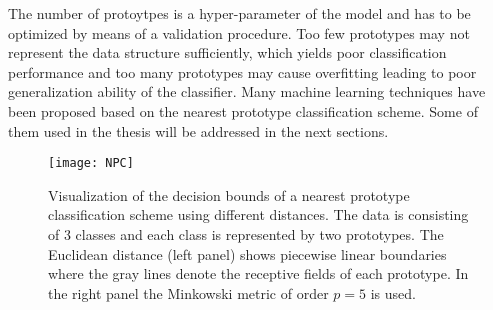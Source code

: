 The number of protoytpes is a hyper-parameter of the model and has to be optimized by means of a validation procedure.  
Too few prototypes may not represent the data structure sufficiently, which yields poor classification performance and 
too many prototypes may cause overfitting leading to poor generalization ability of the classifier. 
Many machine learning techniques have been proposed based on the nearest prototype classification scheme. 
Some of them used in the thesis will be addressed in the next sections. 

\begin{figure}[tpb]
\centering
\texttt{[image: NPC]}%
\caption[Nearest prototype classification]{Visualization of the decision bounds of a nearest prototype classification scheme 
using different distances. The data is consisting of 3 classes and each class is represented by two prototypes. 
The Euclidean distance (left panel) shows piecewise linear boundaries where the gray lines denote the receptive fields of each prototype. 
In the right panel the Minkowski metric of order $p=5$ is used.%
}
\label{fig:NPC}
\end{figure}